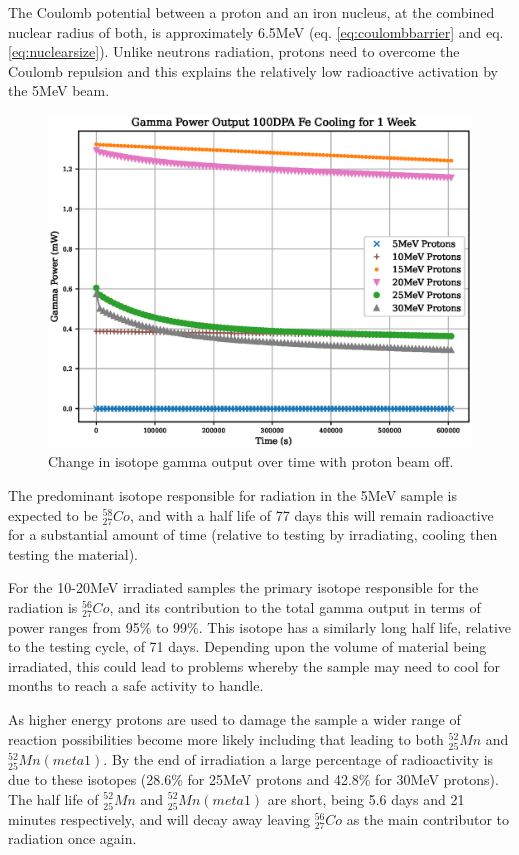 The Coulomb potential between a proton and an iron nucleus, at the combined nuclear radius of both, is approximately 6.5MeV (eq. \ref{eq:coulombbarrier} and eq. \ref{eq:nuclearsize}).  Unlike neutrons radiation, protons need to overcome the Coulomb repulsion and this explains the relatively low radioactive activation by the 5MeV beam.  

\begin{figure}[htb]
\centering
\includegraphics[width=0.7\linewidth]{chapters/activity_code/fe_100dpa/cooling.eps}
\caption{Change in isotope gamma output over time with proton beam off.}
\label{fig:activity-v2-residual-b}
\end{figure}

The predominant isotope responsible for radiation in the 5MeV sample is expected to be ${}^{58}_{27}Co$, and with a half life of 77 days this will remain radioactive for a substantial amount of time (relative to testing by irradiating, cooling then testing the material).

For the 10-20MeV irradiated samples the primary isotope responsible for the radiation is ${}^{56}_{27}Co$, and its contribution to the total gamma output in terms of power ranges from 95\% to 99\%.  This isotope has a similarly long half life, relative to the testing cycle, of 71 days.  Depending upon the volume of material being irradiated, this could lead to problems whereby the sample may need to cool for months to reach a safe activity to handle.

As higher energy protons are used to damage the sample a wider range of reaction possibilities become more likely including that leading to both ${}^{52}_{25}Mn$ and ${}^{52}_{25}Mn (meta 1)$.  By the end of irradiation a large percentage of radioactivity is due to these isotopes (28.6\% for 25MeV protons and 42.8\% for 30MeV protons).  The half life of ${}^{52}_{25}Mn$ and ${}^{52}_{25}Mn (meta 1)$ are short, being 5.6 days and 21 minutes respectively, and will decay away leaving ${}^{56}_{27}Co$ as the main contributor to radiation once again.

